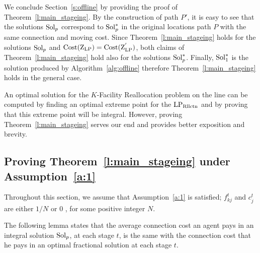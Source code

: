 We conclude Section~\ref{s:offline} by providing 
the proof of Theorem~\ref{l:main_stageing}. By the construction of path $P'$, it is easy to see that the solutions $\mathrm{Sol}_p$ correspond to $\mathrm{Sol}_p^*$ in the original locations path $P$ with the same connection and moving cost. Since Theorem~\ref{l:main_stageing} holds for the solutions $\mathrm{Sol}_p$ and $\mathrm{Cost}(\mathrm{Z}_{\mathrm{LP}})=\mathrm{Cost}(\mathrm{Z}_{\mathrm{LP}}^{'})$, both claims of Theorem~\ref{l:main_stageing} hold also for the solutions  $\mathrm{Sol}_p^*$. Finally, $\mathrm{Sol}_1^*$ is the solution produced by Algorithm~\ref{alg:offline} therefore  Theorem~\ref{l:main_stageing} holds in the general case.


\begin{remark}\label{r:extreme_point}
An optimal solution for the $K$-Facility Reallocation problem on the line can be computed by finding an optimal extreme point for the $\mathrm{LP_{\mathrm{Rllctn}}}$ and by proving that this extreme point will be integral.
However, proving Theorem~\ref{l:main_stageing} serves our end and provides better exposition and brevity.
\end{remark}





\subsection{Proving Theorem~\ref{l:main_stageing} under Assumption~\ref{a:1}}
\label{s:semi_integral}
Throughout this section, we assume that Assumption~\ref{a:1} is satisfied; 
$f_{k j}^t$ and $c_j^t$ are either $1/N$ or $0$ , for some positive integer $N$.  

The following lemma states that the average connection cost an agent pays in an integral solution $\mathrm{Sol}_p$, at each stage $t$, is the same with the connection cost that he pays in an optimal fractional solution at each stage $t$.  


